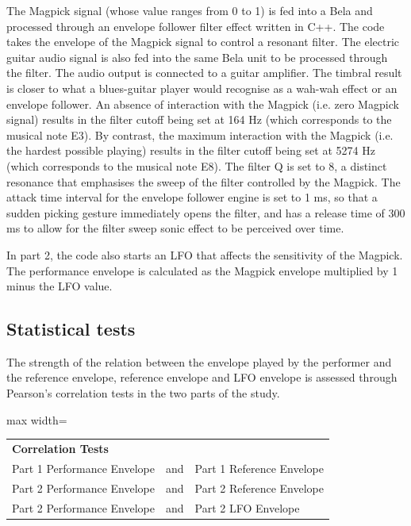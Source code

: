 \documentclass[sigconf]{nimeart}
\begin{document}
The Magpick signal (whose value ranges from 0 to 1) is fed into a Bela \cite{mcpherson2015environment} and processed through an envelope follower filter effect written in C++. The code takes the envelope of the Magpick signal to control a resonant filter. The electric guitar audio signal is also fed into the same Bela unit to be processed through the filter. The audio output is connected to a guitar amplifier. The timbral result is closer to what a blues-guitar player would recognise as a wah-wah effect or an envelope follower. An absence of interaction with the Magpick (i.e. zero Magpick signal) results in the filter cutoff being set at 164 Hz (which corresponds to the musical note E3). By contrast, the maximum interaction with the Magpick (i.e. the hardest possible playing) results in the filter cutoff being set at 5274 Hz (which corresponds to the musical note E8). The filter Q is set to 8, a distinct resonance that emphasises the sweep of the filter controlled by the Magpick. The attack time interval for the envelope follower engine is set to 1 ms, so that a sudden picking gesture immediately opens the filter, and has a release time of 300 ms to allow for the filter sweep sonic effect to be perceived over time.

In part 2, the code also starts an LFO that affects the sensitivity of the Magpick. The performance envelope is calculated as the Magpick envelope multiplied by 1 minus the LFO value.

\subsection{Statistical tests}\label{statistical-tests}

The strength of the relation between the envelope played by the performer and the reference envelope, reference envelope and LFO envelope is assessed through Pearson's correlation tests in the two parts of the study.

\begin{table}[htbp]\centering\small
\begin{adjustbox}{max width=\textwidth}\begin{tabular}{lll}
\toprule
\midrule
\multicolumn{3}{l}{%
\textbf{Correlation Tests}} \\
Part 1 Performance Envelope & and & Part 1 Reference Envelope \\
Part 2 Performance Envelope & and & Part 2 Reference Envelope \\
Part 2 Performance Envelope & and & Part 2 LFO Envelope \\
\bottomrule
\end{tabular}\end{adjustbox}\end{table}
\end{document}
